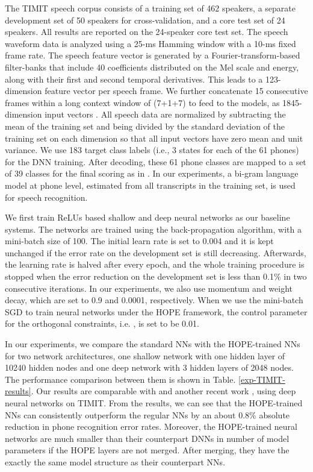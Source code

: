\documentclass[11pt]{article}
\begin{document}
The TIMIT speech corpus consists of a training set of 462 speakers, a separate development set of 50 speakers for cross-validation, and a core test set of 24 speakers. All results are reported on the 24-speaker core test set. 
The speech waveform data is analyzed using a 25-ms Hamming window with a 10-ms fixed frame rate. The speech feature
vector is generated by a Fourier-transform-based filter-banks that include 40 coefficients distributed on the Mel scale and
energy, along with their first and second temporal derivatives. This leads to a 123-dimension feature vector per speech frame.
We further concatenate 15 consecutive frames within a long context window of (7+1+7) to feed to the models, as 1845-dimension input vectors \cite{XueShaofei2014}.  
All speech data are normalized 
by subtracting the mean of the training set and being divided by the standard deviation of the training set on each dimension 
so that all input vectors have zero mean and unit variance.
We use 183 target class labels (i.e., 3 states for each
of the 61 phones) for the DNN training. After decoding, these 61
phone classes are mapped to a set of 39 classes for the final
scoring as in \cite{TIMIT-89}. In our experiments, a bi-gram language
model at phone level, estimated from all transcripts in the
training set, is used for speech recognition.

We first train ReLUs based shallow and deep neural networks as our baseline systems. The networks are trained using the  back-propagation algorithm, with a mini-batch size of 100. The initial learn rate is set to 0.004 and it is kept unchanged if 
the error rate on the development set is still decreasing. Afterwards, the learning rate is halved after every epoch, and the whole training procedure is stopped when the error reduction on the development set is less than 0.1\% in two consecutive iterations. In our experiments, we also use momentum and weight decay, which are set to 0.9 and 0.0001, respectively.  When we use the mini-batch SGD to train neural networks under the HOPE framework, the control parameter for the orthogonal constraints, i.e. , is set to be 0.01. 

In our experiments, we compare the standard NNs with the HOPE-trained NNs for two network architectures, one shallow network with one hidden layer of 10240 hidden nodes and one deep network with 3 hidden layers of 2048 nodes. The performance comparison between them is shown in Table. \ref{exp-TIMIT-results}. Our results are comparable with \cite{XueShaofei2014} and another recent work \cite{NIPS2014_DNN_no_need_deep}, using deep neural networks on TIMIT.
From the results, we can see that the HOPE-trained NNs can consistently outperform the regular NNs by an about 
0.8\% absolute reduction in phone recognition error rates. Moreover, the HOPE-trained neural networks are much smaller than their counterpart DNNs in number of model parameters if the HOPE layers are not merged. After merging, they have the exactly the same model structure as their counterpart NNs. 
\end{document}
